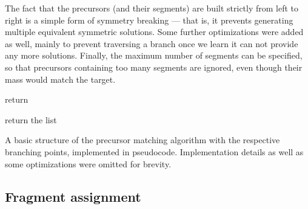 The fact that the precursors (and their segments) are built strictly from left to right is a simple form of symmetry breaking --- that is, it prevents generating multiple equivalent symmetric solutions. Some further optimizations were added as well, mainly to prevent traversing a branch once we learn it can not provide any more solutions. Finally, the maximum number of segments can be specified, so that precursors containing too many segments are ignored, even though their mass would match the target.


\begin{algorithm}
  \begin{algorithmic}

    \label{alg:findprec:combinations} 
    \EndIf

    \State return  
    \EndIf

    \label{alg:findprec:end}
    \EndFor
    \EndIf


    \label{alg:findprec:elongate}

    \State return the list 
    \EndFunction
  \end{algorithmic}
  \caption{A basic structure of the precursor matching algorithm with the respective branching points, implemented in pseudocode. Implementation details as well as some optimizations were omitted for brevity.}\label{alg:findprec}
\end{algorithm}

\subsection{Fragment assignment}

